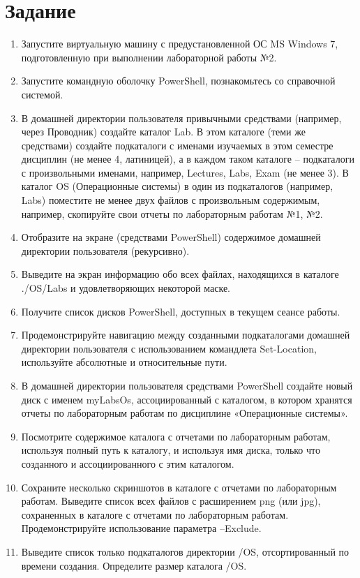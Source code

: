 \documentclass[a4paper]{article}
\begin{document}
\section{Задание}
\begin{enumerate}
    \item Запустите виртуальную машину с предустановленной ОС MS Windows 7, подготовленную при выполнении лабораторной работы №2.
    \item Запустите командную оболочку PowerShell, познакомьтесь со справочной системой.
    \item В домашней директории пользователя привычными средствами (например, через Проводник) создайте каталог Lab. В этом каталоге (теми же средствами) создайте подкаталоги с именами изучаемых в этом семестре дисциплин (не менее 4, латиницей), а в каждом таком каталоге – подкаталоги с произвольными именами, например, Lectures, Labs, Exam (не менее 3). В каталог OS (Операционные системы) в один из подкаталогов (например, Labs) поместите не менее двух файлов с произвольным содержимым, например, скопируйте свои отчеты по лабораторным работам №1, №2.
    \item Отобразите на экране (средствами PowerShell) содержимое домашней директории пользователя (рекурсивно).
    \item Выведите на экран информацию обо всех файлах, находящихся в каталоге ./OS/Labs и удовлетворяющих некоторой маске.
    \item Получите список дисков PowerShell, доступных в текущем сеансе работы.
    \item Продемонстрируйте навигацию между созданными подкаталогами домашней директории пользователя с использованием командлета Set-Location, используйте абсолютные и относительные пути.
    \item В домашней директории пользователя средствами PowerShell создайте новый диск с именем myLabsOs, ассоциированный с каталогом, в котором хранятся отчеты по лабораторным работам по дисциплине «Операционные системы».
    \item Посмотрите содержимое каталога с отчетами по лабораторным работам, используя полный путь к каталогу, и используя имя диска, только что созданного и ассоциированного с этим каталогом.
    \item  Сохраните несколько скриншотов в каталоге с отчетами по лабораторным работам. Выведите список всех файлов с расширением png (или jpg), сохраненных в каталоге с отчетами по лабораторным работам. Продемонстрируйте использование параметра –Exclude.
    \item  Выведите список только подкаталогов директории /OS, отсортированный по времени создания. Определите размер каталога /OS.

\end{enumerate}
\end{document}
